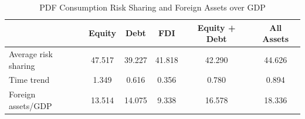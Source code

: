 \begin{table}[!htbp] \centering
\caption{PDF Consumption Risk Sharing and Foreign Assets over GDP}
\label{tab:table5_consumption_assets}
\begin{tabular}{lccccc}
\hline\hline
 & Equity & Debt & FDI & Equity + Debt & All Assets \\
\hline
Average risk sharing & 47.517 & 39.227 & 41.818 & 42.290 & 44.626 \\
Time trend & 1.349 & 0.616 & 0.356 & 0.780 & 0.894 \\
Foreign assets/GDP & 13.514 & 14.075 & 9.338 & 16.578 & 18.336 \\
\hline\hline
\end{tabular}
\end{table}
